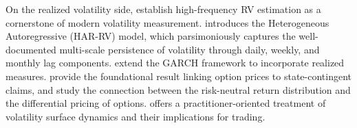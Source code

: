 \documentclass[11pt,a4paper]{article}
\begin{document}
On the realized volatility side, \citet{andersen2003modeling} establish high-frequency RV estimation as a cornerstone of modern volatility measurement.
\citet{corsi2009simple} introduces the Heterogeneous Autoregressive (HAR-RV) model, which parsimoniously captures the well-documented multi-scale persistence of volatility through daily, weekly, and monthly lag components.
\citet{hansen2012realized} extend the GARCH framework to incorporate realized measures.
\citet{breeden1978prices} provide the foundational result linking option prices to state-contingent claims, and \citet{bakshi2003stock} study the connection between the risk-neutral return distribution and the differential pricing of options.
\citet{gatheral2006volatility} offers a practitioner-oriented treatment of volatility surface dynamics and their implications for trading.

\end{document}
